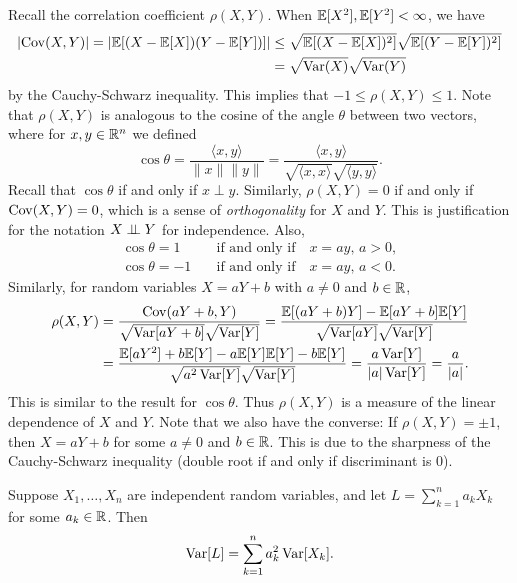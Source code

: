 \begin{remark}
  Recall the correlation coefficient $\rho(X, Y)$.
  When $\mathbb{E}[X^2], \mathbb{E}[Y^2] < \infty$, we have
  \begin{align*}
    |{\operatorname{Cov}(X, Y)}| = |\mathbb{E}[(X - \mathbb{E}[X])(Y - \mathbb{E}[Y])]|
    &\le \sqrt{\mathbb{E}[(X - \mathbb{E}[X])^2]}\sqrt{\mathbb{E}[(Y - \mathbb{E}[Y])^2]} \\
    &= \sqrt{\operatorname{Var}(X)}\sqrt{\operatorname{Var}(Y)}
  \end{align*}
  by the Cauchy-Schwarz inequality. This implies
  that $-1 \le \rho(X, Y) \le 1$. Note that $\rho(X, Y)$ is analogous to the cosine of the angle $\theta$ between two vectors,
  where for $x, y \in \mathbb{R}^n$ we defined
  \[
    \cos \theta = \frac{\langle x, y \rangle}{\|x\|\|y\|}
    = \frac{\langle x, y \rangle}{\sqrt{\langle x, x \rangle}\sqrt{\langle y, y \rangle}}.
  \]
  Recall that $\cos \theta$ if and only if
  $x \perp y$. Similarly,
  $\rho(X, Y) = 0$ if and only if $\operatorname{Cov}(X, Y) = 0$,
  which is a sense of \emph{orthogonality} for
  $X$ and $Y$. This is justification for the
  notation $X \perp\!\!\!\perp Y$ for independence.
  Also,
  \begin{align*}
    \cos \theta = 1 \quad &\text{if and only if} \quad x = a y, \, a > 0, \\
    \cos \theta = -1 \quad &\text{if and only if} \quad x = a y, \, a < 0.
  \end{align*}
  Similarly, for random variables $X = aY + b$
  with $a \ne 0$ and $b \in \mathbb{R}$,
  \begin{align*}
    \rho(X, Y)
    &= \frac{\operatorname{Cov}(aY + b, Y)}{\sqrt{\operatorname{Var}[aY + b]}\sqrt{\operatorname{Var}[Y]}}
    = \frac{\mathbb{E}[(aY + b)Y] - \mathbb{E}[aY + b]\mathbb{E}[Y]}{\sqrt{\operatorname{Var}[aY]}\sqrt{\operatorname{Var}[Y]}} \\
    &= \frac{\mathbb{E}[aY^2] + b \mathbb{E}[Y] - a\mathbb{E}[Y]\mathbb{E}[Y] - b \mathbb{E}[Y]}{\sqrt{a^2 \operatorname{Var}[Y]} \sqrt{\operatorname{Var}[Y]}}
    = \frac{a\operatorname{Var}[Y]}{|a| \operatorname{Var}[Y]} = \frac{a}{|a|}.
  \end{align*}
  This is similar to the result for $\cos \theta$.
  Thus $\rho(X, Y)$ is a measure of the linear
  dependence of $X$ and $Y$.
  Note that we also have the converse:
  If $\rho(X, Y) = \pm 1$, then $X = aY + b$ for
  some $a \ne 0$ and $b \in \mathbb{R}$. This is due to the
  sharpness of the Cauchy-Schwarz inequality
  (double root if and only if discriminant is $0$).
\end{remark}

\begin{prop}
  Suppose $X_1, \dots, X_n$ are independent
  random variables, and let
  $L = \sum_{k = 1}^n a_k X_k$ for some
  $a_k \in \mathbb{R}$. Then
  \[
    \operatorname{Var}[L] = \sum_{k = 1}^n a_k^2 \operatorname{Var}[X_k].
  \]
\end{prop}

